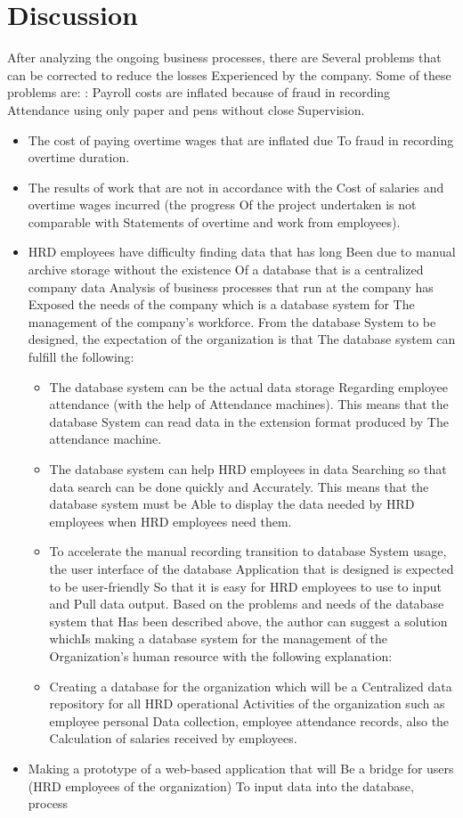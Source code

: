 \documentclass[12pt,a4paper]{article}
\begin{document}
\section*{Discussion}After analyzing the ongoing business processes, there are Several problems that can be corrected to reduce the losses Experienced by the company. Some of these problems are:
: Payroll costs are inflated because of fraud in recording Attendance using only paper and pens without close Supervision.
\begin{itemize}
    \item The cost of paying overtime wages that are inflated due To fraud in recording overtime duration.
\item The results of work that are not in accordance with the Cost of salaries and overtime wages incurred (the progress Of the project undertaken is not comparable with Statements of overtime and work from employees).
\item HRD employees have difficulty finding data that has long Been due to manual archive storage without the existence Of a database that is a centralized company data Analysis of business processes that run at the company has Exposed the needs of the company which is a database system for The management of the company’s workforce. From the database System to be designed, the expectation of the organization is that The database system can fulfill the following:
\begin{itemize}
    \item The database system can be the actual data storage Regarding employee attendance (with the help of Attendance machines). This means that the database System can read data in the extension format produced by The attendance machine.
\item The database system can help HRD employees in data Searching so that data search can be done quickly and Accurately. This means that the database system must be Able to display the data needed by HRD employees when HRD employees need them.
\item To accelerate the manual recording transition to database System usage, the user interface of the database Application that is designed is expected to be user-friendly So that it is easy for HRD employees to use to input and Pull data output.
Based on the problems and needs of the database system that Has been described above, the author can suggest a solution whichIs making a database system for the management of the Organization’s human resource with the following explanation:
\item  Creating a database for the organization which will be a Centralized data repository for all HRD operational Activities of the organization such as employee personal Data collection, employee attendance records, also the Calculation of salaries received by employees.
\end{itemize}
\item Making a prototype of a web-based application that will Be a bridge for users (HRD employees of the organization) To input data into the database, process
\end{itemize}
\end{document}
